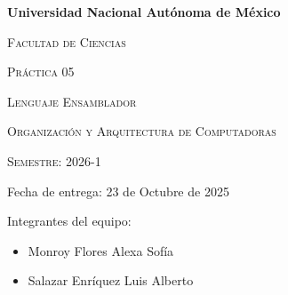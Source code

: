 \documentclass{article}
\begin{document}
  \begin{titlepage}
  	\vspace*{0.8cm}
  	\centering
  	{\bfseries\huge Universidad Nacional Autónoma de México \par}
  	\vspace{1cm}
  	{\scshape\huge Facultad de Ciencias \par}
  	\vspace{2cm}
  	{\scshape\Huge Práctica 05 \par}
  	\vfill
		{\scshape\Large Lenguaje Ensamblador \par}
  	\vspace{1.5cm}
  	{\scshape\Large Organización y Arquitectura de Computadoras \par}
  	\vfill
  	{\scshape\Large Semestre: 2026-1\par}
  	\vspace{1.5cm}
		{\Large Fecha de entrega: 23 de Octubre de 2025\par}
		\vspace{1.5cm}
		{\Large Integrantes del equipo:\par}
		\begin {itemize}
		\item Monroy Flores Alexa Sofía
		\item Salazar Enríquez Luis Alberto
		\end{itemize}
  \end{titlepage}

	\pagestyle{fancy}
\end{document}
